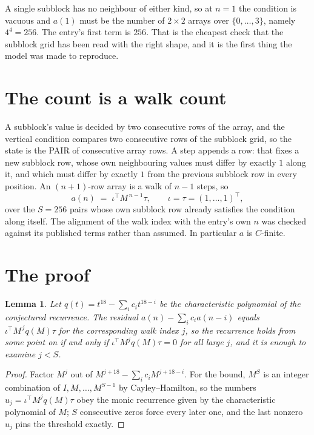 \documentclass[11pt,a4paper]{article}
\theoremstyle{plain}
\newtheorem{lemma}[theorem]{Lemma}
\theoremstyle{definition}
\begin{document}
A single subblock has no neighbour of either kind, so at $n=1$ the condition is vacuous and
$a(1)$ must be the number of $2\times2$ arrays over $\{0,\dots,3\}$, namely
$4^{4}=256$. The entry's first term is $256$.
That is the cheapest check that the subblock grid has been read with the right shape, and it
is the first thing the model was made to reproduce.

\section{The count is a walk count}

A subblock's value is decided by two consecutive rows of the array, and the
vertical condition compares two consecutive rows of the subblock grid, so the state is the
PAIR of consecutive array rows. A step appends a row: that fixes a new subblock row, whose own
neighbouring values must differ by exactly $1$ along it, and which must differ by exactly
$1$ from the previous subblock row in every position. An $(n+1)$-row array is a walk of
$n-1$ steps, so
\[
a(n)\;=\;\iota^{\!\top}M^{\,n-1}\tau,\qquad\iota=\tau=(1,\dots,1)^{\!\top},
\]
over the $S=256$ pairs whose own subblock row already satisfies the condition along itself.
The alignment of the walk index with the entry's own $n$ was checked against its published
terms rather than assumed. In particular $a$ is $C$-finite.

\section{The proof}

\begin{lemma}\label{lem:crit}
Let $q(t)=t^{18}-\sum_i c_it^{18-i}$ be the characteristic polynomial of the
conjectured recurrence. The residual $a(n)-\sum_ic_ia(n-i)$ equals
$\iota^{\!\top}M^{\,j}q(M)\tau$ for the corresponding walk index $j$, so the recurrence
holds from some point on if and only if $\iota^{\!\top}M^{j}q(M)\tau=0$ for all large $j$,
and it is enough to examine $j<S$.
\end{lemma}

\begin{proof}
Factor $M^{j}$ out of $M^{j+18}-\sum_ic_iM^{j+18-i}$. For the bound, $M^{S}$
is an integer combination of $I,M,\dots,M^{S-1}$ by Cayley--Hamilton, so the numbers
$u_j=\iota^{\!\top}M^{j}q(M)\tau$ obey the monic recurrence given by the characteristic
polynomial of $M$; $S$ consecutive zeros force every later one, and the last nonzero $u_j$
pins the threshold exactly.
\end{proof}
\end{document}
